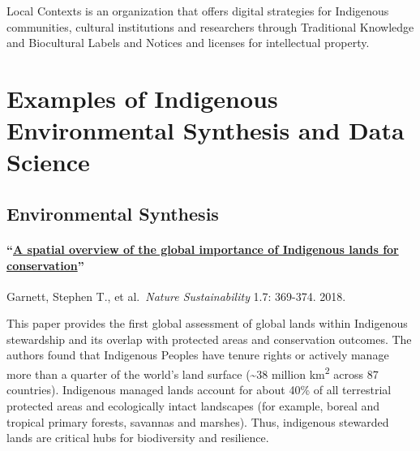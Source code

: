 \documentclass[
]{book}
\begin{document}
Local Contexts is an organization that offers digital strategies for Indigenous communities, cultural institutions and researchers through Traditional Knowledge and Biocultural Labels and Notices and licenses for intellectual property.

\hypertarget{examples-of-indigenous-environmental-synthesis-and-data-science}{%
\chapter{Examples of Indigenous Environmental Synthesis and Data Science}\label{examples-of-indigenous-environmental-synthesis-and-data-science}}

\hypertarget{environmental-synthesis}{%
\section{Environmental Synthesis}\label{environmental-synthesis}}

\hypertarget{a-spatial-overview-of-the-global-importance-of-indigenous-lands-for-conservation}{%
\subsubsection*{\texorpdfstring{``\href{https://www.nature.com/articles/s41893-018-0100-6?ss_source=sscampaigns\&ss_campaign_id=5c424fe9d20e280001eb02bf\&ss_email_id=5c5cf4c39bca21000175c9fd\&ss_campaign_name=Introducing+the+Interfaith+Rainforest+Initiative\&ss_campaign_sent_date=2019-02-08T03:17:24Z}{A spatial overview of the global importance of Indigenous lands for conservation}''}{``A spatial overview of the global importance of Indigenous lands for conservation''}}\label{a-spatial-overview-of-the-global-importance-of-indigenous-lands-for-conservation}}

Garnett, Stephen T., et al.~\emph{Nature Sustainability} 1.7: 369-374. 2018.

This paper provides the first global assessment of global lands within Indigenous stewardship and its overlap with protected areas and conservation outcomes. The authors found that Indigenous Peoples have tenure rights or actively manage more than a quarter of the world's land surface (\textasciitilde38 million km\textsuperscript{2} across 87 countries). Indigenous managed lands account for about 40\% of all terrestrial protected areas and ecologically intact landscapes (for example, boreal and tropical primary forests, savannas and marshes). Thus, indigenous stewarded lands are critical hubs for biodiversity and resilience.
\end{document}

